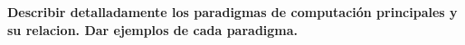 \item \textbf{Describir detalladamente los paradigmas de computación principales y su relacion. Dar ejemplos de cada paradigma.}